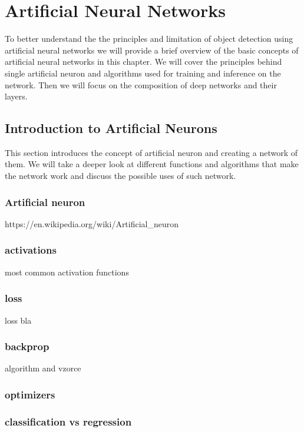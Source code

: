 \chapter{Artificial Neural Networks}
\label{chapt:nnets}
To better understand the the principles and limitation of object detection using artificial neural networks we will provide a brief overview of the basic concepts of artificial neural networks in this chapter. We will cover the principles behind single artificial neuron and algorithms used for training and inference on the network. Then we will focus on the composition of deep networks and their layers.

\section{Introduction to Artificial Neurons}
This section introduces the concept of artificial neuron and creating a network of them. We will take a deeper look at different functions and algorithms that make the network work and discuss the possible uses of such network.

\subsection{Artificial neuron}
https://en.wikipedia.org/wiki/Artificial\_neuron


\subsection{activations}
most common activation functions 

\subsection{loss}
loss bla

\subsection{backprop}
algorithm and vzorce

\subsection{optimizers}

\subsection{classification vs regression}

